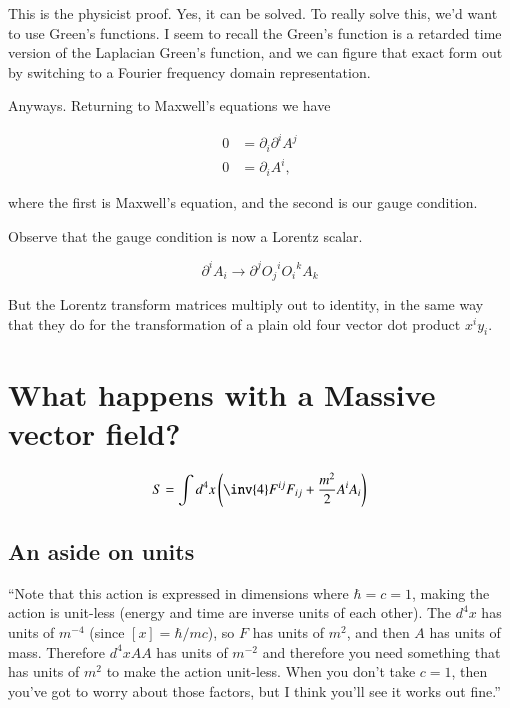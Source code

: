 This is the physicist proof.  Yes, it can be solved.  To really solve this, we'd want to use Green's functions.  I seem to recall the Green's function is a retarded time version of the Laplacian Green's function, and we can figure that exact form out by switching to a Fourier frequency domain representation.

Anyways.  Returning to Maxwell's equations we have

\begin{align}\label{eqn:relativisticElectrodynamicsL14:530}
0 &= \partial_i \partial^i A^j \\
0 &= \partial_i A^i ,
\end{align}

where the first is Maxwell's equation, and the second is our gauge condition.

Observe that the gauge condition is now a Lorentz scalar.

\begin{equation}\label{eqn:relativisticElectrodynamicsL14:550}
\partial^i A_i \rightarrow \partial^j {O_j}^i {O_i}^k A_k
\end{equation}

But the Lorentz transform matrices multiply out to identity, in the same way that they do for the transformation of a plain old four vector dot product $x^i y_i$.

\section{What happens with a Massive vector field?}

\begin{equation}\label{eqn:relativisticElectrodynamicsL14:570}
S = \int d^4 x \left( \inv{4} F^{ij} F_{ij} + \frac{m^2}{2} A^i A_i \right)
\end{equation}

\subsection{An aside on units}

``Note that this action is expressed in dimensions where $\hbar = c = 1$, making the action is unit-less (energy and time are inverse units of each other).  The $d^4x$ has units of $m^{-4}$ (since $[x] = \hbar/mc$), so $F$ has units of $m^2$, and then $A$ has units of mass. Therefore $d^4x A A$ has units of $m^{-2}$ and therefore you need something that has units of $m^2$ to make the action unit-less. When you don't take $c=1$, then you've got to worry about those factors, but I think you'll see it works out fine.''

